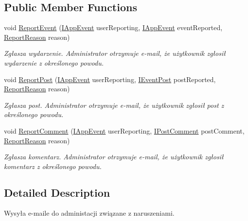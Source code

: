 \subsection*{Public Member Functions}
\begin{DoxyCompactItemize}
\item 
void \hyperlink{interface_contract_1_1_i_report_inappropriate_content_service_a2b127060ebec3e52cf1bdf7335996f1a}{Report\+Event} (\hyperlink{interface_contract_1_1_i_app_event}{I\+App\+Event} user\+Reporting, \hyperlink{interface_contract_1_1_i_app_event}{I\+App\+Event} event\+Reported, \hyperlink{namespace_contract_ac533e9a5fffe5319dcbdc2388bc54715}{Report\+Reason} reason)
\begin{DoxyCompactList}\small\item\em Zgłasza wydarzenie. Administrator otrzymuje e-\/mail, że użytkownik zgłosił wydarzenie z określonego powodu. \end{DoxyCompactList}\item 
void \hyperlink{interface_contract_1_1_i_report_inappropriate_content_service_ab318b4b110b2d794f028f8af4f19704e}{Report\+Post} (\hyperlink{interface_contract_1_1_i_app_event}{I\+App\+Event} user\+Reporting, \hyperlink{interface_contract_1_1_i_event_post}{I\+Event\+Post} post\+Reported, \hyperlink{namespace_contract_ac533e9a5fffe5319dcbdc2388bc54715}{Report\+Reason} reason)
\begin{DoxyCompactList}\small\item\em Zgłasza post. Administrator otrzymuje e-\/mail, że użytkownik zgłosił post z określonego powodu. \end{DoxyCompactList}\item 
void \hyperlink{interface_contract_1_1_i_report_inappropriate_content_service_a893c8eb3b793586a468926a03ca1bb02}{Report\+Comment} (\hyperlink{interface_contract_1_1_i_app_event}{I\+App\+Event} user\+Reporting, \hyperlink{interface_contract_1_1_i_post_comment}{I\+Post\+Comment} post\+Comment, \hyperlink{namespace_contract_ac533e9a5fffe5319dcbdc2388bc54715}{Report\+Reason} reason)
\begin{DoxyCompactList}\small\item\em Zgłasza komentarz. Administrator otrzymuje e-\/mail, że użytkownik zgłosił komentarz z określonego powodu. \end{DoxyCompactList}\end{DoxyCompactItemize}


\subsection{Detailed Description}
Wysyła e-\/maile do administacji związane z naruszeniami. 



